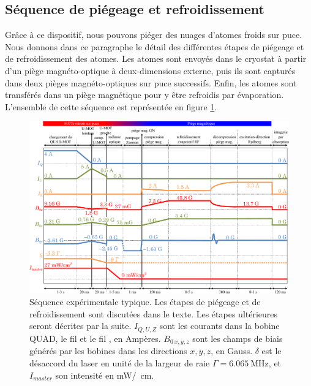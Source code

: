 \subsection{Séquence de piégeage et refroidissement}\label{subsec:exp_seq}
\noindent Grâce à ce dispositif, nous pouvons piéger des nuages d'atomes froids sur puce.
Nous donnons dans ce paragraphe le détail des différentes étapes de piégeage et de refroidissement des atomes.
Les atomes sont envoyés dans le cryostat à partir d'un piège magnéto-optique à deux-dimensions externe, puis ils sont capturés dans deux pièges magnéto-optiques sur puce successifs.
Enfin, les atomes sont transférés dans un piège magnétique pour y être refroidis par évaporation.
L'ensemble de cette séquence est représentée en figure \ref{fig:exp_sequence}.
%	
\begin{figure}
\centering
\includegraphics[width=\linewidth]{figures/setup/coldatoms/exp_sequence}
\caption[Séquence expérimentale typique]{Séquence expérimentale typique.%
Les étapes de piégeage et de refroidissement sont %
discutées dans le texte.
Les étapes ultérieures seront décrites par la suite.
$I_{Q,U,Z}$ sont les courants dans la bobine QUAD, le fil  et le fil , en Ampères.
$B_{0~x,y,z}$ sont les champs de biais générés par les bobines dans les directions $x,y,z$, en Gauss.
$\delta$ est le désaccord du laser en unité de la largeur de raie $\Gamma=\SI{6.065}{\MHz}$, et $I_{master}$ son intensité en \si[per-mode=symbol]{\milli\watt \per\squared\cm}.
}
\label{fig:exp_sequence}
\end{figure}


